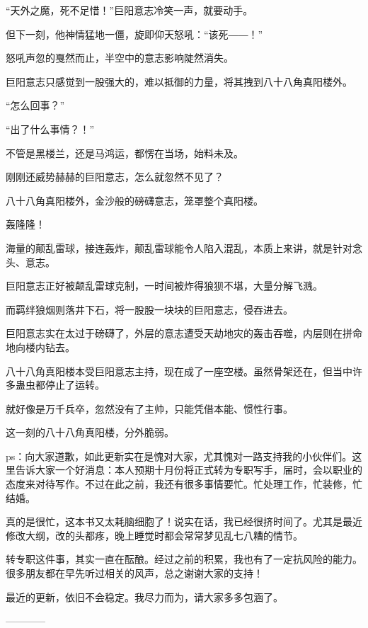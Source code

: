 \begin{this_body}
“天外之魔，死不足惜！”巨阳意志冷笑一声，就要动手。

但下一刻，他神情猛地一僵，旋即仰天怒吼：“该死――！”

怒吼声忽的戛然而止，半空中的意志影响陡然消失。

巨阳意志只感觉到一股强大的，难以抵御的力量，将其拽到八十八角真阳楼外。

“怎么回事？”

“出了什么事情？！”

不管是黑楼兰，还是马鸿运，都愣在当场，始料未及。

刚刚还威势赫赫的巨阳意志，怎么就忽然不见了？

八十八角真阳楼外，金沙般的磅礴意志，笼罩整个真阳楼。

轰隆隆！

海量的颠乱雷球，接连轰炸，颠乱雷球能令人陷入混乱，本质上来讲，就是针对念头、意志。

巨阳意志正好被颠乱雷球克制，一时间被炸得狼狈不堪，大量分解飞溅。

而羁绊狼烟则落井下石，将一股股一块块的巨阳意志，侵吞进去。

巨阳意志实在太过于磅礴了，外层的意志遭受天劫地灾的轰击吞噬，内层则在拼命地向楼内钻去。

八十八角真阳楼本受巨阳意志主持，现在成了一座空楼。虽然骨架还在，但当中许多蛊虫都停止了运转。

就好像是万千兵卒，忽然没有了主帅，只能凭借本能、惯性行事。

这一刻的八十八角真阳楼，分外脆弱。

ps：向大家道歉，如此更新实在是愧对大家，尤其愧对一路支持我的小伙伴们。这里告诉大家一个好消息：本人预期十月份将正式转为专职写手，届时，会以职业的态度来对待写作。不过在此之前，我还有很多事情要忙。忙处理工作，忙装修，忙结婚。

真的是很忙，这本书又太耗脑细胞了！说实在话，我已经很挤时间了。尤其是最近修改大纲，改的头都疼，晚上睡觉时都会常常梦见乱七八糟的情节。

转专职这件事，其实一直在酝酿。经过之前的积累，我也有了一定抗风险的能力。很多朋友都在早先听过相关的风声，总之谢谢大家的支持！

最近的更新，依旧不会稳定。我尽力而为，请大家多多包涵了。

------------

\end{this_body}

